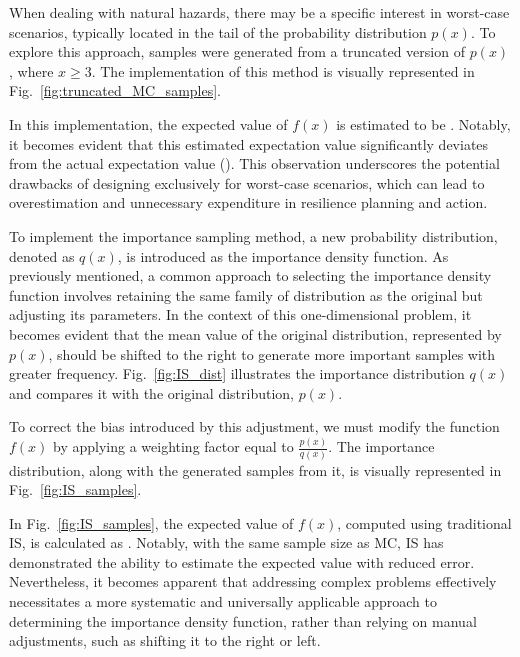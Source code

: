     When dealing with natural hazards, there may be a specific interest in worst-case scenarios, typically located in the tail of the probability distribution $p(x)$. To explore this approach, samples were generated from a truncated version of $p(x)$, where $x\geq 3$. The implementation of this method is visually represented in Fig.~\ref{fig:truncated_MC_samples}.
    
    

    In this implementation, the expected value of $f(x)$ is estimated to be \TruncatedMCResult. Notably, it becomes evident that this estimated expectation value significantly deviates from the actual expectation value (\TrueValue). This observation underscores the potential drawbacks of designing exclusively for worst-case scenarios, which can lead to overestimation and unnecessary expenditure in resilience planning and action.

    To implement the importance sampling method, a new probability distribution, denoted as $q(x)$, is introduced as the importance density function. As previously mentioned, a common approach to selecting the importance density function involves retaining the same family of distribution as the original but adjusting its parameters. In the context of this one-dimensional problem, it becomes evident that the mean value of the original distribution, represented by $p(x)$, should be shifted to the right to generate more important samples with greater frequency. Fig.~\ref{fig:IS_dist} illustrates the importance distribution $q(x)$ and compares it with the original distribution, $p(x)$. 
    
    
    
    To correct the bias introduced by this adjustment, we must modify the function $f(x)$ by applying a weighting factor equal to $\frac{p(x)}{q(x)}$. The importance distribution, along with the \SampleSize{} generated samples from it, is visually represented in Fig.~\ref{fig:IS_samples}.
    
    

    In Fig.~\ref{fig:IS_samples}, the expected value of $f(x)$, computed using traditional IS, is calculated as \TraditionalISResult{}. Notably, with the same sample size as MC, IS has demonstrated the ability to estimate the expected value with reduced error. Nevertheless, it becomes apparent that addressing complex problems effectively necessitates a more systematic and universally applicable approach to determining the importance density function, rather than relying on manual adjustments, such as shifting it to the right or left.

